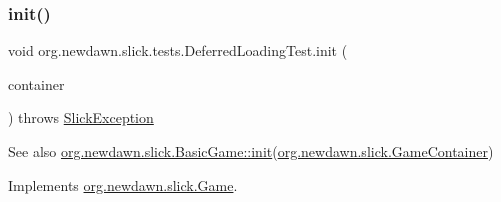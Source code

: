 \subsubsection{\texorpdfstring{init()}{init()}}
{\footnotesize\ttfamily void org.\+newdawn.\+slick.\+tests.\+Deferred\+Loading\+Test.\+init (\begin{DoxyParamCaption}\item[{\mbox{\hyperlink{classorg_1_1newdawn_1_1slick_1_1_game_container}{Game\+Container}}}]{container }\end{DoxyParamCaption}) throws \mbox{\hyperlink{classorg_1_1newdawn_1_1slick_1_1_slick_exception}{Slick\+Exception}}\hspace{0.3cm}{\ttfamily [inline]}}

\begin{DoxySeeAlso}{See also}
\mbox{\hyperlink{classorg_1_1newdawn_1_1slick_1_1_basic_game_a8af0900217e4d389249f71367b22d114}{org.\+newdawn.\+slick.\+Basic\+Game\+::init}}(\mbox{\hyperlink{classorg_1_1newdawn_1_1slick_1_1_game_container}{org.\+newdawn.\+slick.\+Game\+Container}}) 
\end{DoxySeeAlso}


Implements \mbox{\hyperlink{interfaceorg_1_1newdawn_1_1slick_1_1_game_ad2dd6affab08bb8fdb5fab0815957b7a}{org.\+newdawn.\+slick.\+Game}}.


